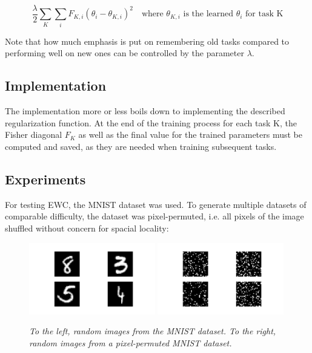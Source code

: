 \documentclass{article}
\begin{document}
        \begin{equation*}
            \frac{\lambda}{2}\sum_{K}{
                \sum_{i}{F_{K,i}(\theta_i - \theta_{K,i})^2}\quad
                \text{where $\theta_{K,i}$ is the learned $\theta_i$ for task K} 
            }
        \end{equation*}

        Note that how much emphasis is put on remembering old tasks compared to 
        performing well on new ones can be controlled by the parameter $\lambda$.
        
        \subsection*{Implementation}
        The implementation more or less boils down to implementing the described 
        regularization function. At the end of the training process for each task K, the Fisher diagonal 
        $F_K$ as well as the final value for the trained parameters must be computed
        and saved, as they are needed when training subsequent tasks. 
        
        \subsection*{Experiments}
        For testing EWC, the MNIST dataset was used. To generate 
        multiple datasets of comparable difficulty, the dataset was 
        pixel-permuted, i.e. all pixels of the image shuffled without concern
        for spacial locality: 

        \begin{figure}[H]
            \includegraphics[width=0.49\textwidth]{figures/regular_mnist.png}
            \includegraphics[width=0.49\textwidth]{figures/permuted_mnist.png}
            \caption{\textit{To the left, random images from the MNIST dataset. 
            To the right, random images from a pixel-permuted MNIST dataset.}}
        \end{figure}
\end{document}
